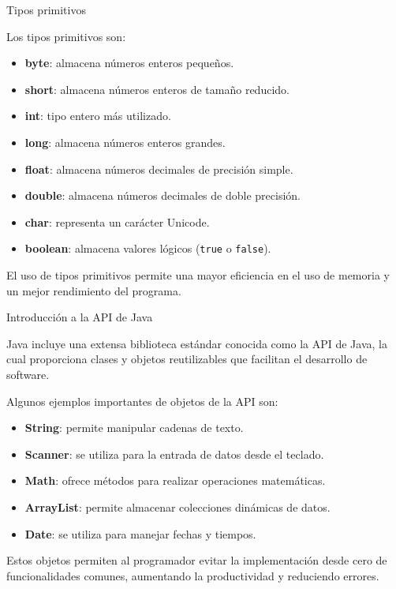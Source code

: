 \documentclass{beamer}
\begin{document}
\begin{frame}{Tipos primitivos}

Los tipos primitivos son:
\begin{itemize}
    \item \textbf{byte}: almacena números enteros pequeños.
    \item \textbf{short}: almacena números enteros de tamaño reducido.
    \item \textbf{int}: tipo entero más utilizado.
    \item \textbf{long}: almacena números enteros grandes.
    \item \textbf{float}: almacena números decimales de precisión simple.
    \item \textbf{double}: almacena números decimales de doble precisión.
    \item \textbf{char}: representa un carácter Unicode.
    \item \textbf{boolean}: almacena valores lógicos (\texttt{true} o \texttt{false}).
\end{itemize}

El uso de tipos primitivos permite una mayor eficiencia en el uso de memoria y un mejor rendimiento del programa.


\end{frame}

\begin{frame}{Introducción a la API de Java}

Java incluye una extensa biblioteca estándar conocida como la API de Java, la cual proporciona clases y objetos reutilizables que facilitan el desarrollo de software.

Algunos ejemplos importantes de objetos de la API son:
\begin{itemize}
    \item \textbf{String}: permite manipular cadenas de texto.
    \item \textbf{Scanner}: se utiliza para la entrada de datos desde el teclado.
    \item \textbf{Math}: ofrece métodos para realizar operaciones matemáticas.
    \item \textbf{ArrayList}: permite almacenar colecciones dinámicas de datos.
    \item \textbf{Date}: se utiliza para manejar fechas y tiempos.
\end{itemize}

Estos objetos permiten al programador evitar la implementación desde cero de funcionalidades comunes, aumentando la productividad y reduciendo errores.

\end{frame}
\end{document}
